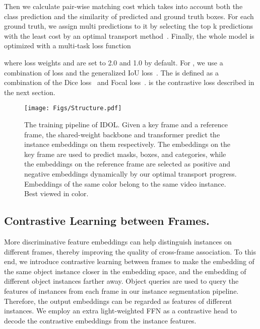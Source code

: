 \documentclass[runningheads]{llncs}
\begin{document}
Then we calculate pair-wise matching cost which takes into account both the class prediction and the similarity of predicted and ground truth boxes.
For each ground truth, we assign multi predictions to it by selecting the top k predictions with the least cost by an optimal transport method~\cite{OTA,yolox}. Finally, the whole model is optimized with a multi-task loss function

where loss weights  and  are set to 2.0 and 1.0 by default. For , we use a combination of  loss and the generalized IoU loss~\cite{giou}. The  is defined as a combination of the Dice loss~\cite{diceloss} and Focal loss~\cite{focalloss}.  is the contrastive loss described in the next section. 



\begin{figure}[t]
	\centering
	\texttt{[image: Figs/Structure.pdf]}
	\caption{The training pipeline of IDOL. 
	Given a key frame and a reference frame, the shared-weight backbone and transformer predict the instance embeddings on them respectively. The embeddings on the key frame are used to predict masks, boxes, and categories, while the embeddings on the reference frame are selected as positive and negative embeddings dynamically by our optimal transport progress.
	Embeddings of the same color belong to the same video instance. Best viewed in color.}
	\label{fig:training}
\end{figure}




\subsection{Contrastive Learning between Frames.}
\label{sec:Contrastive}

More discriminative feature embeddings can help distinguish instances on different frames, thereby improving the quality of cross-frame association. To this end, we introduce contrastive learning between frames to make the embedding of the same object instance closer in the embedding space, and the embedding of different object instances farther away.
Object queries are used to query the features of instances from each frame in our instance segmentation pipeline. Therefore, the output embeddings can be regarded as features of different instances. We employ an extra light-weighted FFN as a contrastive head to decode the contrastive embeddings from the instance features.
\end{document}
